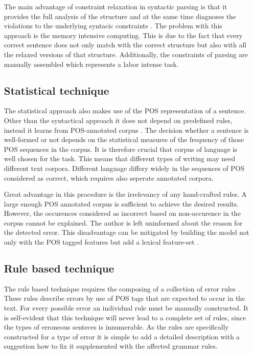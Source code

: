 \documentclass[runningheads]{llncs}
\begin{document}
The main advantage of constraint relaxation in syntactic parsing is that it provides the full analysis of the structure and at the same time diagnoses the violations to the underlying syntacic constraints \citep{vandeventer_creating_2001}. The problem with this approach is the memory intensive computing. This is due to the fact that every correct sentence does not only match with the correct structure but also with all the relaxed versions of that structure. Additionally, the constraints of parsing are manually assembled which represents a labor intense task. 

\subsection{Statistical technique}
The statistical approach also makes use of the POS representation of a sentence. Other than the syntactical approach it does not depend on predefined rules, instead it learns from POS-annotated corpus \citep{manchanda_various_2016}. The decision whether a sentence is well-formed or not depends on the statistical measures of the frequency of those POS sequences in the corpus. It is therefore crucial that corpus of language is well chosen for the task. This means that different types of writing may need different text corpora. Different language differy widely in the sequences of POS considered as correct, which requires also seperate annotated corpora.

Great advantage in this procedure is the irrelevancy of any hand-crafted rules. A large enough POS annotated corpus is sufficient to achieve the desired results. However, the occurences considered as incorrect based on non-occurence in the corpus cannot be explained. The author is left uninformed about the reason for the detected error. This disadvantage can be mitigated by building the model not only with the POS tagged features but add a lexical feature-set \citep{gamon_using_2009}.

\subsection{Rule based technique}
The rule based technique requires the composing of a collection of error rules \citep{manchanda_various_2016}. These rules describe errors by use of POS tags that are expected to occur in the text. For every possible error an individual rule must be manually constructed. It is self-evident that this technique will never lead to a complete set of rules, since the types of erroneous senteces is innumerable. As the rules are specifically constructed for a type of error it is simple to add a detailed description with a suggestion how to fix it supplemented with the affected grammar rules.
\end{document}
